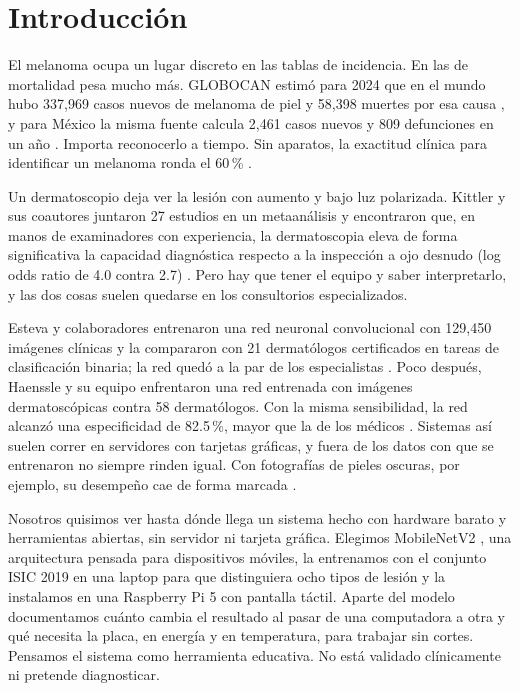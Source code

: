 \documentclass[pdflatex,sn-mathphys-num]{sn-jnl}%
\theoremstyle{thmstyleone}%
\theoremstyle{thmstyletwo}%
\theoremstyle{thmstylethree}%
\begin{document}
\section{Introducción}\label{sec1}

El melanoma ocupa un lugar discreto en las tablas de incidencia. En las de mortalidad pesa mucho más. GLOBOCAN estimó para 2024 que en el mundo hubo 337,969 casos nuevos de melanoma de piel y 58,398 muertes por esa causa \cite{sung2026}, y para México la misma fuente calcula 2,461 casos nuevos y 809 defunciones en un año \cite{mexico_melanoma}. Importa reconocerlo a tiempo. Sin aparatos, la exactitud clínica para identificar un melanoma ronda el 60\,\% \cite{kittler2002}.

Un dermatoscopio deja ver la lesión con aumento y bajo luz polarizada. Kittler y sus coautores juntaron 27 estudios en un metaanálisis y encontraron que, en manos de examinadores con experiencia, la dermatoscopia eleva de forma significativa la capacidad diagnóstica respecto a la inspección a ojo desnudo (log odds ratio de 4.0 contra 2.7) \cite{kittler2002}. Pero hay que tener el equipo y saber interpretarlo, y las dos cosas suelen quedarse en los consultorios especializados.

Esteva y colaboradores entrenaron una red neuronal convolucional con 129,450 imágenes clínicas y la compararon con 21 dermatólogos certificados en tareas de clasificación binaria; la red quedó a la par de los especialistas \cite{esteva2017}. Poco después, Haenssle y su equipo enfrentaron una red entrenada con imágenes dermatoscópicas contra 58 dermatólogos. Con la misma sensibilidad, la red alcanzó una especificidad de 82.5\,\%, mayor que la de los médicos \cite{haenssle2018}. Sistemas así suelen correr en servidores con tarjetas gráficas, y fuera de los datos con que se entrenaron no siempre rinden igual. Con fotografías de pieles oscuras, por ejemplo, su desempeño cae de forma marcada \cite{daneshjou2022}.

Nosotros quisimos ver hasta dónde llega un sistema hecho con hardware barato y herramientas abiertas, sin servidor ni tarjeta gráfica. Elegimos MobileNetV2 \cite{sandler2018}, una arquitectura pensada para dispositivos móviles, la entrenamos con el conjunto ISIC 2019 \cite{isic2019} en una laptop para que distinguiera ocho tipos de lesión y la instalamos en una Raspberry Pi 5 con pantalla táctil. Aparte del modelo documentamos cuánto cambia el resultado al pasar de una computadora a otra y qué necesita la placa, en energía y en temperatura, para trabajar sin cortes. Pensamos el sistema como herramienta educativa. No está validado clínicamente ni pretende diagnosticar.
\end{document}
